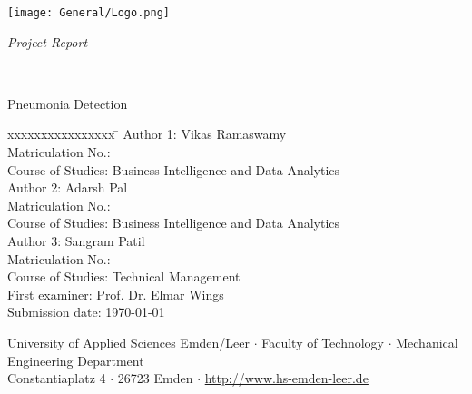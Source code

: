 %
%

\begin{titlepage}
    
    \begin{flushleft} 
        \texttt{[image: General/Logo.png]}
    \end{flushleft} 
    
    \begin{flushright}
        \vspace{1.5cm}
        \LARGE \textsl{Project Report}\\
        \rule{0.6\textwidth}{0.4pt} ~\\
        \vspace{0.5cm}
        \textsf{\LARGE Pneumonia Detection}\\
    \end{flushright}
    
    \vspace{1.5cm}
    \large
    \begin{tabbing}
        xxxxxxxxxxxxxxxx \= \kill
        Author 1: \> Vikas Ramaswamy \\
        Matriculation No.:  \\
        Course of Studies: \> Business Intelligence and Data Analytics \\ [0.5cm]
        
        Author 2: \> Adarsh Pal \\
        Matriculation No.:  \\
        Course of Studies: \> Business Intelligence and Data Analytics \\ [0.5cm]
        
         Author 3: \> Sangram Patil \\
        Matriculation No.:  \\
        Course of Studies: \>  Technical Management \\ [0.5cm]
        
        First examiner: \> Prof. Dr. Elmar Wings \\
        Submission date: \> \today \\
    \end{tabbing}
    
    \vspace{2cm}
    \small
    \begin{center}
        University of Applied Sciences Emden/Leer $\cdot$ 
        Faculty of Technology $\cdot$ 
        Mechanical Engineering Department \\
        Constantiaplatz 4 $\cdot$ 
        26723 Emden $\cdot$ 
        \url{http://www.hs-emden-leer.de}
    \end{center}
    
\end{titlepage}
